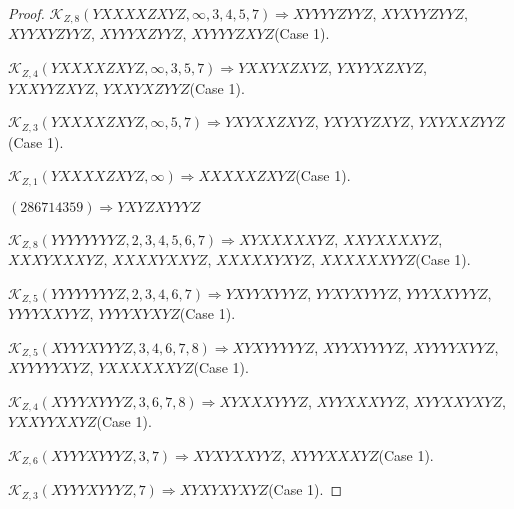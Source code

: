 \documentclass[12pt]{article}
\theoremstyle{plain}
\theoremstyle{definition}
\theoremstyle{remark}
\newcommand{\fancy}[1]{\mathcal{#1}}
\def\K{\fancy{K}}
\begin{document}
\begin{proof}
	$\K_{Z,8}(YXXXXZXYZ,\infty,3, 4, 5, 7)\Rightarrow $$XYYYYZYYZ$, $XYXYYZYYZ$, $XYYXYZYYZ$, $XYYYXZYYZ$, $XYYYYZXYZ$(Case 1).
	
	$\K_{Z,4}(YXXXXZXYZ,\infty,3, 5, 7)\Rightarrow $$YXXYXZXYZ$, $YXYYXZXYZ$, $YXXYYZXYZ$, $YXXYXZYYZ$(Case 1).
	
	$\K_{Z,3}(YXXXXZXYZ,\infty,5, 7)\Rightarrow $$YXYXXZXYZ$, $YXYXYZXYZ$, $YXYXXZYYZ$(Case 1).
	
	$\K_{Z,1}(YXXXXZXYZ,\infty)\Rightarrow $$XXXXXZXYZ$(Case 1).
	
	
	
	$(2 8 6 7 1 4 3 5 9)\Rightarrow YXYZXYYYZ$
	
	
	
	$\K_{Z,8}(YYYYYYYYZ,2, 3, 4, 5, 6, 7)\Rightarrow $$XYXXXXXYZ$, $XXYXXXXYZ$, $XXXYXXXYZ$, $XXXXYXXYZ$, $XXXXXYXYZ$, $XXXXXXYYZ$(Case 1).
	
	$\K_{Z,5}(YYYYYYYYZ,2, 3, 4, 6, 7)\Rightarrow $$YXYYXYYYZ$, $YYXYXYYYZ$, $YYYXXYYYZ$, $YYYYXXYYZ$, $YYYYXYXYZ$(Case 1).
	
	$\K_{Z,5}(XYYYXYYYZ,3, 4, 6, 7, 8)\Rightarrow $$XYXYYYYYZ$, $XYYXYYYYZ$, $XYYYYXYYZ$, $XYYYYYXYZ$, $YXXXXXXYZ$(Case 1).
	
	$\K_{Z,4}(XYYYXYYYZ,3, 6, 7, 8)\Rightarrow $$XYXXXYYYZ$, $XYYXXXYYZ$, $XYYXXYXYZ$, $YXXYYXXYZ$(Case 1).
	
	$\K_{Z,6}(XYYYXYYYZ,3, 7)\Rightarrow $$XYXYXXYYZ$, $XYYYXXXYZ$(Case 1).
	
	$\K_{Z,3}(XYYYXYYYZ,7)\Rightarrow $$XYXYXYXYZ$(Case 1).
	
	
	

\end{proof}
\end{document}
